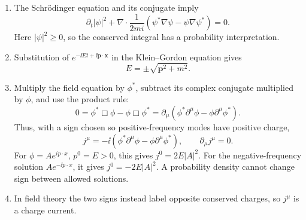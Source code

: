 
\begin{enumerate}
\begin{enumerate}
\item
The Schrödinger equation and its conjugate imply
\[
 \partial_t|\psi|^2+\nabla\cdot
 \frac{1}{2mi}(\psi^*\nabla\psi-\psi\nabla\psi^*)=0.
\]
Here \(|\psi|^2\geq0\), so the conserved integral has a probability
interpretation.
\item
Substitution of \(e^{-\ii Et+\ii\mathbf p\cdot\mathbf x}\) in the
Klein--Gordon equation gives
\[
 E=\pm\sqrt{\mathbf p^2+m^2}.
\]
\item
Multiply the field equation by \(\phi^*\), subtract its complex conjugate
multiplied by \(\phi\), and use the product rule:
\[
 0=\phi^*\Box\phi-\phi\Box\phi^*
 =\partial_\mu\left(\phi^*\partial^\mu\phi
 -\phi\partial^\mu\phi^*\right).
\]
Thus, with a sign chosen so positive-frequency modes have positive charge,
\[
 j^\mu=-\ii\left(\phi^*\partial^\mu\phi
 -\phi\partial^\mu\phi^*\right),\qquad \partial_\mu j^\mu=0.
\]
For \(\phi=Ae^{ip\cdot x}\), \(p^0=E>0\), this gives
\(j^0=2E|A|^2\).  For the negative-frequency solution
\(Ae^{-\ii p\cdot x}\), it gives \(j^0=-2E|A|^2\).  A probability density
cannot change sign between allowed solutions.
\item
In field theory the two
signs instead label opposite conserved charges, so \(j^\mu\) is a charge
current.
\end{enumerate}


\end{enumerate}
